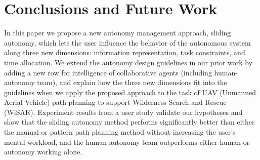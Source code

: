 \documentclass[lettersize, apacite, twoside, HRI]{apa_HRI}
\begin{document}
%
%

\section{Conclusions and Future Work} 
\label{sec:Conclusions6}

In this paper we propose a new autonomy management approach, sliding autonomy, which lets the user influence the behavior of the autonomous system along three new dimensions: information representation, task constraints, and time allocation. We extend the autonomy design guidelines in our prior work by adding a new row for intelligence of collaborative agents (including human-autonomy team), and explain how the three new dimensions fit into the guidelines when we apply the proposed approach to the task of UAV (Unmanned Aerial Vehicle) path planning to support Wilderness Search and Rescue (WiSAR). Experiment results from a user study validate our hypotheses and show that the sliding autonomy method performs significantly better than either the manual or pattern path planning method without increasing the user's mental workload, and the human-autonomy team outperforms either human or autonomy working alone.
\end{document}
